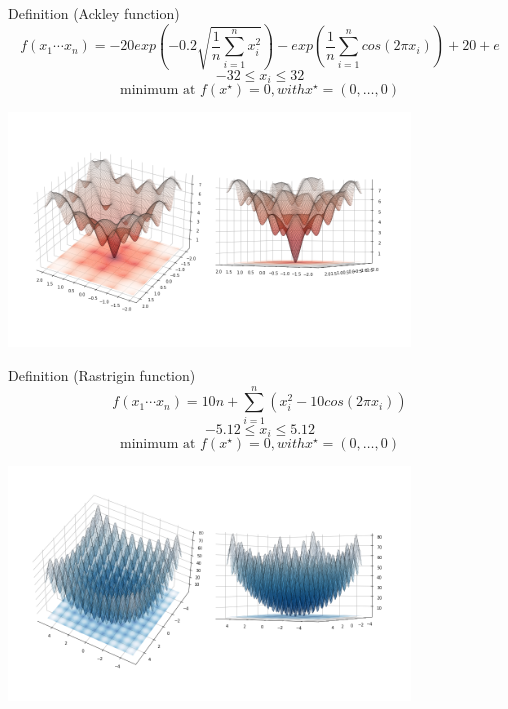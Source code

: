 \documentclass{beamer}
\newcommand{\backupend}{
   \addtocounter{framenumberappendix}{-\value{framenumber}}
   \addtocounter{framenumber}{\value{framenumberappendix}}
}
\begin{document}
\begin{frame}
  \begin{block}{Definition (Ackley function)}
    $$f(x_1 \cdots x_n) = -20 exp(-0.2 \sqrt{\frac{1}{n} \sum_{i=1}^n x_i^2}) - exp(\frac{1}{n} \sum_{i=1}^n cos(2\pi x_i)) + 20 + e$$
    $$-32 \leq x_i \leq 32$$
    $$\text{minimum at } f(x^{\star}) = 0, with x^{\star} = (0, \dots, 0)$$
  \end{block}
  \centering
  \includegraphics[width=0.8\textwidth]{figures/introduction-ackley}
\end{frame}
\begin{frame}
  \begin{block}{Definition (Rastrigin function)}
    $$f(x_1 \cdots x_n) = 10n + \sum_{i=1}^n (x_i^2 -10cos(2\pi x_i))$$
    $$-5.12 \leq x_i \leq 5.12$$
    $$\text{minimum at } f(x^{\star}) = 0, with x^{\star} = (0, \dots, 0)$$
  \end{block}
  \centering
  \includegraphics[width=0.8\textwidth]{figures/introduction-rastrigin}
\end{frame}
\backupend
\end{document}
